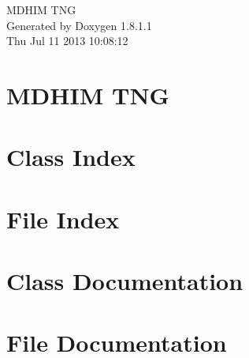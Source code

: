 \documentclass{book}
\begin{document}
\hypersetup{pageanchor=false,citecolor=blue}
\begin{titlepage}
\vspace*{7cm}
\begin{center}
{\Large M\-D\-H\-I\-M T\-N\-G }\\
\vspace*{1cm}
{\large Generated by Doxygen 1.8.1.1}\\
\vspace*{0.5cm}
{\small Thu Jul 11 2013 10:08:12}\\
\end{center}
\end{titlepage}
\clearemptydoublepage
{}
\tableofcontents
\clearemptydoublepage
{}
\hypersetup{pageanchor=true,citecolor=blue}
\chapter{M\-D\-H\-I\-M T\-N\-G}
\label{index}\hypertarget{index}{}
\chapter{Class Index}

\chapter{File Index}

\chapter{Class Documentation}























\chapter{File Documentation}


















\printindex
\end{document}
